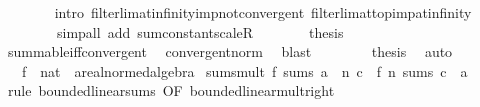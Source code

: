 \begin{isabellebody}
\ \ \ \ \ \ \isamarkupfalse%
\ {\isacharparenleft}{\kern0pt}intro\ filterlim{\isacharunderscore}{\kern0pt}at{\isacharunderscore}{\kern0pt}infinity{\isacharunderscore}{\kern0pt}imp{\isacharunderscore}{\kern0pt}not{\isacharunderscore}{\kern0pt}convergent\ filterlim{\isacharunderscore}{\kern0pt}at{\isacharunderscore}{\kern0pt}top{\isacharunderscore}{\kern0pt}imp{\isacharunderscore}{\kern0pt}at{\isacharunderscore}{\kern0pt}infinity{\isacharparenright}{\kern0pt}\isanewline
\ \ \ \ \ \ \ \ {\isacharparenleft}{\kern0pt}simp{\isacharunderscore}{\kern0pt}all\ add{\isacharcolon}{\kern0pt}\ sum{\isacharunderscore}{\kern0pt}constant{\isacharunderscore}{\kern0pt}scaleR{\isacharparenright}{\kern0pt}\isanewline
\ \ \ \ \isamarkupfalse%
\ \isamarkupfalse%
\ {\isacharquery}{\kern0pt}thesis\isanewline
\ \ \ \ \ \ \isamarkupfalse%
\ summable{\isacharunderscore}{\kern0pt}iff{\isacharunderscore}{\kern0pt}convergent\ \isamarkupfalse%
\ convergent{\isacharunderscore}{\kern0pt}norm\ \isamarkupfalse%
\ blast\isanewline
\ \ \isamarkupfalse%
\isanewline
\ \ \isamarkupfalse%
\ \isamarkupfalse%
\ {\isacharquery}{\kern0pt}thesis\ \isamarkupfalse%
\ auto\isanewline
{}\isamarkupfalse%
%
\endisatagproof
{\isafoldproof}%
%
\isadelimproof
%
\endisadelimproof
%
\isadelimdocument
%
\endisadelimdocument
%
\isatagdocument
%
\isamarkuptrue%
%
\endisatagdocument
{\isafolddocument}%
%
\isadelimdocument
%
\endisadelimdocument
{}\isamarkupfalse%
\isanewline
\ \ \ f\ {\isacharcolon}{\kern0pt}{\isacharcolon}{\kern0pt}\ {\isachardoublequoteopen}nat\ {\isasymRightarrow}\ {\isacharprime}{\kern0pt}a{\isacharcolon}{\kern0pt}{\isacharcolon}{\kern0pt}real{\isacharunderscore}{\kern0pt}normed{\isacharunderscore}{\kern0pt}algebra{\isachardoublequoteclose}\isanewline
{}\isanewline
\isanewline
{}\isamarkupfalse%
\ sums{\isacharunderscore}{\kern0pt}mult{\isacharcolon}{\kern0pt}\ {\isachardoublequoteopen}f\ sums\ a\ {\isasymLongrightarrow}\ {\isacharparenleft}{\kern0pt}{\isasymlambda}n{\isachardot}{\kern0pt}\ c\ {\isacharasterisk}{\kern0pt}\ f\ n{\isacharparenright}{\kern0pt}\ sums\ {\isacharparenleft}{\kern0pt}c\ {\isacharasterisk}{\kern0pt}\ a{\isacharparenright}{\kern0pt}{\isachardoublequoteclose}\isanewline
%
\isadelimproof
\ \ %
\endisadelimproof
%
\isatagproof
{}\isamarkupfalse%
\ {\isacharparenleft}{\kern0pt}rule\ bounded{\isacharunderscore}{\kern0pt}linear{\isachardot}{\kern0pt}sums\ {\isacharbrackleft}{\kern0pt}OF\ bounded{\isacharunderscore}{\kern0pt}linear{\isacharunderscore}{\kern0pt}mult{\isacharunderscore}{\kern0pt}right{\isacharbrackright}{\kern0pt}{\isacharparenright}{\kern0pt}%

\end{isabellebody}

